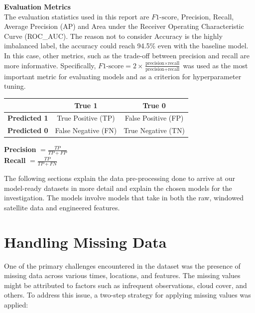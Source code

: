 \documentclass[a4paper,11pt]{report}
\begin{document}
\noindent \textbf{Evaluation Metrics} \\
The evaluation statistics used in this report are \(F1\text{-score}\), Precision, Recall, Average Precision (AP) and Area under the Receiver Operating Characteristic Curve (ROC\_AUC). The reason not to consider Accuracy is the highly imbalanced label, the accuracy could reach 94.5\% even with the baseline model. In this case, other metrics, such as the trade-off between precision and recall are more informative. Specifically, \(F1\text{-score} = 2 \times \frac{\text{precision} \times \text{recall}}{\text{precision} + \text{recall}}\) was used as the most important metric for evaluating models and as a criterion for hyperparameter tuning. 

\vspace{0.5cm}
\begin{minipage}{.25\textwidth}
\begin{tabular}{c|cc}
\hline
 & \textbf{True 1} & \textbf{True 0} \\ \hline
\textbf{Predicted 1} & True Positive (TP) & False Positive (FP) \\ 
\textbf{Predicted 0} & False Negative (FN) & True Negative (TN) \\ \hline
\end{tabular}
\end{minipage}%
\hfill
\begin{minipage}{.3\textwidth}
\centering
\textbf{Precision} \(= \frac{TP}{TP + FP}\) \\
\vspace{1em}
\hspace{1.5em}\textbf{Recall} \(= \frac{TP}{TP + FN}\)
\end{minipage}
\vspace{0.5cm}

The following sections explain the data pre-processing done to arrive at our model-ready datasets in more detail and explain the chosen models for the investigation. The models involve models that take in both the raw, windowed satellite data and engineered features.

\section{Handling Missing Data}

One of the primary challenges encountered in the dataset was the presence of missing data across various times, locations, and features. The missing values might be attributed to factors such as infrequent observations, cloud cover, and others. To address this issue, a two-step strategy for applying missing values was applied:
\end{document}
